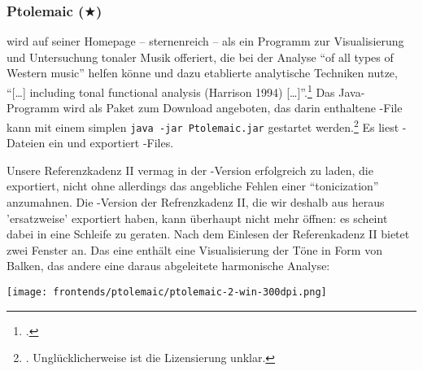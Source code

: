 %
%
%




\subsubsection{Ptolemaic ($\bigstar$)}

\label{Ptolemaic} wird auf seiner Homepage -- sternenreich -- als
ein Programm zur Visualisierung und Untersuchung tonaler Musik offeriert, die
bei der Analyse \enquote{of all types of Western music} helfen könne und dazu
etablierte analytische Techniken nutze, \enquote{[\ldots] including tonal
functional analysis (Harrison 1994) [\ldots]}.\footcite[vgl.][\nopage
wp]{Ptolemaic2016a} Das Java-Programm wird als Paket zum Download angeboten, das
darin enthaltene -File kann mit einem simplen \texttt{java -jar
Ptolemaic.jar} gestartet werden.\footnote{\cite[vgl.][\nopage
wp]{Ptolemaic2016b}. Unglücklicherweise ist die Lizensierung unklar.} Es liest
-Dateien ein und exportiert -Files.

Unsere Referenzkadenz II vermag  in der -Version
erfolgreich zu laden, die  exportiert, nicht ohne allerdings das
angebliche Fehlen einer \enquote{tonicization} anzumahnen. Die
-Version der Refrenzkadenz II, die wir deshalb aus 
heraus 'ersatzweise' exportiert haben, kann  überhaupt nicht mehr
öffnen: es scheint dabei in eine Schleife zu geraten. Nach dem Einlesen der
Referenkadenz II bietet  zwei Fenster an. Das eine enthält eine
Visualisierung der Töne in Form von Balken, das andere eine daraus abgeleitete
harmonische Analyse:

\begin{center}
\texttt{[image: frontends/ptolemaic/ptolemaic-2-win-300dpi.png]}
\end{center}


